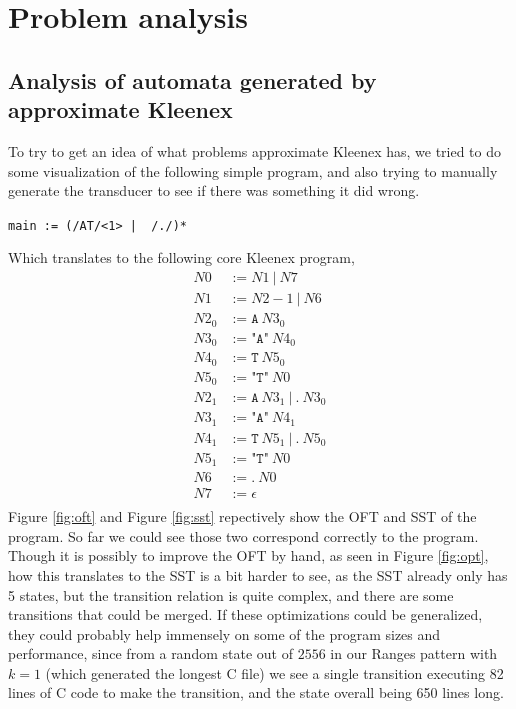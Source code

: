 \section{Problem analysis}

\subsection{Analysis of automata generated by approximate Kleenex}
To try to get an idea of what problems approximate Kleenex has, we tried to do
some visualization of the following simple program, and also
trying to manually generate the transducer to see if there was something it did
wrong.
\begin{center}
    \texttt{main := (/AT/<1> | ~/./)*}
\end{center}

Which translates to the following core Kleenex program,
\begin{align*}
    N0      &:= N1\ |\ N7\\
    N1      &:= N2-1\ |\ N6\\
    N2_0    &:= \texttt{A}\ N3_0\\
    N3_0    &:= \texttt{"A"}\ N4_0\\
    N4_0    &:= \texttt{T}\ N5_0\\
    N5_0    &:= \texttt{"T"}\ N0\\
    N2_1    &:= \texttt{A}\ N3_1\ |\ \texttt{.}\ N3_0\\
    N3_1    &:= \texttt{"A"}\ N4_1\\
    N4_1    &:= \texttt{T}\ N5_1\ |\ \texttt{.}\ N5_0\\
    N5_1    &:= \texttt{"T"}\ N0\\
    N6      &:= \texttt{.}\ N0\\
    N7      &:= \epsilon\\
\end{align*}
Figure \ref{fig:oft} and Figure \ref{fig:sst} repectively show the OFT and SST
of the program. So far we could see those two correspond correctly to the
program. Though it is possibly to improve the OFT by hand, as seen in Figure
\ref{fig:opt}, how this translates to the SST is a bit harder to see, as the
SST already only has 5 states, but the transition relation is quite complex,
and there are some transitions that could be merged. If these optimizations
could be generalized, they could probably help immensely on some of the program
sizes and performance, since from a random state out of $2556$ in our Ranges
pattern with $k = 1$ (which generated the longest C file) we see a single
transition executing 82 lines of C code to make the transition, and the state
overall being 650 lines long.

